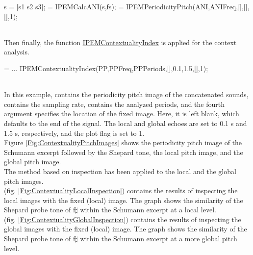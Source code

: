 \begin{IPEMCodeEnvironment}
s = [s1 s2 s3];
 = IPEMCalcANI(s,fs);
 = IPEMPeriodicityPitch(ANI,ANIFreq,[],[],[],1);
\end{IPEMCodeEnvironment}\\

Then finally, the function
\hyperlink{FuncRef:IPEMContextualityIndex}{IPEMContextualityIndex}
 is applied for the context analysis.\\

\begin{IPEMCodeEnvironment}
 = ...
\newline IPEMContextualityIndex(PP,PPFreq,PPPeriods,[],0.1,1.5,[],1);
\end{IPEMCodeEnvironment}\\

In this example,  contains the periodicity
pitch image of the concatenated sounds, 
contains the sampling rate,  contains
the analyzed periods, and the fourth argument specifies the
location of the fixed image. Here, it is left blank, which
defaults to the end of the signal. The local and global echoes are
set to 0.1 s and 1.5 s, respectively, and the plot flag is set to
1.\\

Figure \ref{Fig:ContextualityPitchImages} shows the periodicity
pitch image of the Schumann excerpt followed by the Shepard tone,
the local pitch image, and the global pitch image.\\
The method based on inspection has been applied to the local and
the global pitch images.\\

(fig. \ref{Fig:ContextualityLocalInspection}) contains the results
of inspecting the local images with the fixed (local) image. The
graph shows the similarity of the Shepard probe tone of
f$\sharp$ within the Schumann excerpt at a local level.\\

(fig. \ref{Fig:ContextualityGlobalInspection}) contains the
results of inspecting the global images with the fixed (local)
image. The graph shows the similarity of the Shepard probe tone of
f$\sharp$ within the Schumann excerpt at a more global pitch
level.\\

